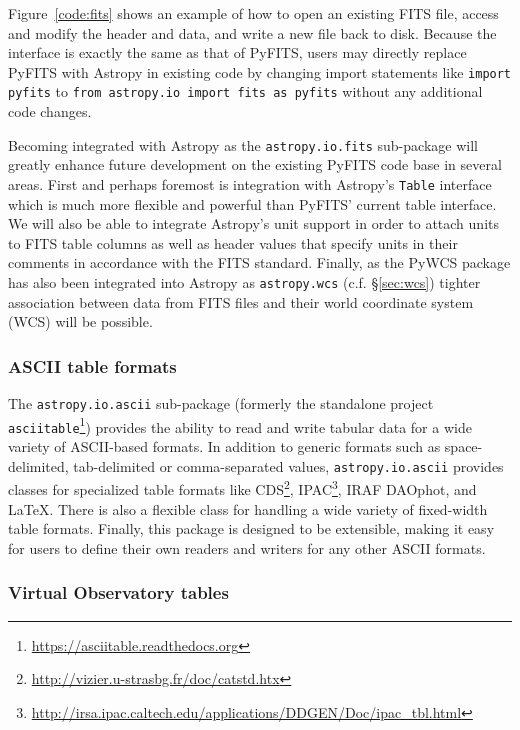 \documentclass[traditabstract]{aa}
\begin{document}
Figure~\ref{code:fits} shows an example of how to open an existing FITS file,
access and modify the header and data, and write a new file back to disk.
Because the interface is exactly the same as that of PyFITS, users may directly
replace PyFITS with Astropy in existing code by changing import statements like
\texttt{import pyfits} to \texttt{from astropy.io import fits as pyfits}
without any additional code changes.

Becoming integrated with Astropy as the \texttt{astropy.io.fits} sub-package will
greatly enhance future development on the existing PyFITS code base in several
areas. First and perhaps foremost is integration with Astropy's \texttt{Table}
interface which is much more flexible and powerful than PyFITS' current table
interface. We will also be able to integrate Astropy's unit support in order to
attach units to FITS table columns as well as header values that specify units
in their comments in accordance with the FITS standard. Finally, as the PyWCS
package has also been integrated into Astropy as \texttt{astropy.wcs} (c.f.
\S\ref{sec:wcs}) tighter association between data from FITS files and their
world coordinate system (WCS) will be possible.

\subsubsection{ASCII table formats}

\label{sec:ascii}


The \texttt{astropy.io.ascii} sub-package (formerly the standalone project
\texttt{asciitable}\footnote{\url{https://asciitable.readthedocs.org}})
provides the ability to read and write tabular data for a wide variety of
ASCII-based formats. In addition to generic formats such as space-delimited,
tab-delimited or comma-separated values, \texttt{astropy.io.ascii} provides
classes for specialized table formats like
CDS\footnote{\url{http://vizier.u-strasbg.fr/doc/catstd.htx}},
IPAC\footnote{\url{http://irsa.ipac.caltech.edu/applications/DDGEN/Doc/ipac_tbl.html}},
IRAF DAOphot, and LaTeX. There is also a flexible class for handling a wide
variety of fixed-width table formats. Finally, this package is designed to be
extensible, making it easy for users to define their own readers and writers for
any other ASCII formats.

\subsubsection{Virtual Observatory tables}
\end{document}
